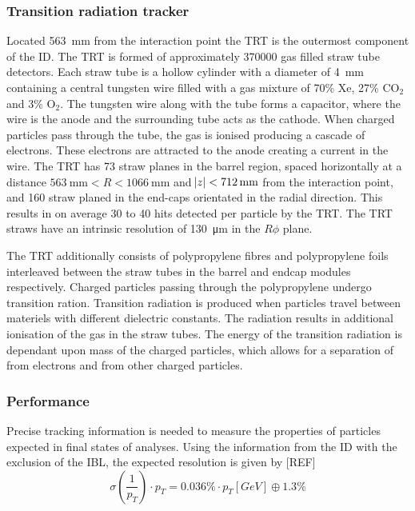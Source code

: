 \subsubsection{Transition radiation tracker}
Located \SI{563}{\milli\meter} from the interaction point the TRT is the outermost component of the ID. The TRT is formed of approximately 370000 gas filled straw tube detectors. Each straw tube is a hollow cylinder with a diameter of \SI{4}{\milli\meter} containing a central tungsten wire filled with a gas mixture of 70\% Xe, 27\% CO$_{2}$ and 3\% O$_{2}$. The tungsten wire along with the tube forms a capacitor, where the wire is the anode and the surrounding tube acts as the cathode. When charged particles pass through the tube, the gas is ionised producing a cascade of electrons. These electrons are attracted to the anode creating a current in the wire. The TRT has 73 straw planes in the barrel region, spaced horizontally at a distance $\SI{563}{\milli\meter} < R < \SI{1066}{\milli\meter}$ and $\abs{z} < \SI{712}{\milli\meter}$ from the interaction point, and 160 straw planed in the end-caps orientated in the radial direction. This results in on average 30 to 40 hits detected per particle by the TRT. The TRT straws have an intrinsic resolution of \SI{130}{\micro\meter} in the $R\phi$ plane. 

The TRT additionally consists of polypropylene fibres and polypropylene foils interleaved between the straw tubes in the barrel and endcap modules respectively. Charged particles passing through the polypropylene undergo transition ration. Transition radiation is produced when particles travel between materiels with different dielectric constants. The radiation results in additional ionisation of the gas in the straw tubes. The energy of the transition radiation is dependant upon mass of the charged particles, which allows for a separation of from electrons and from other charged particles.  

\subsubsection{Performance}

Precise tracking information is needed to measure the properties of particles expected in final states of analyses. Using the information from the ID with the exclusion of the IBL, the expected resolution is given by [REF]
\begin{equation}
   \sigma(\frac{1}{p_{T}}) \cdot p_{T} = 0.036 \% \cdot p_{T}[GeV] \oplus 1.3 \%
\end{equation}

